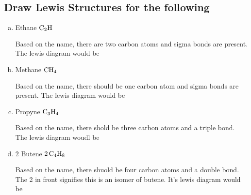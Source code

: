 \documentclass{scrartcl}
\begin{document}
\subsection{Draw Lewis Structures for the following}
\label{sec:org9180697}
\begin{enumerate}[a.]
\item Ethane \(\ce{C2H}\)

Based on the name, there are two carbon atoms and sigma bonds are present.
The lewis diagram would be

\item Methane \(\ce{CH4}\)

Based on the name, there should be one carbon atom and sigma bonds are
present. The lewis diagram would be

\item Propyne \(\ce{C3H4}\)

Based on the name, there shold be three carbon atoms and a triple bond. The
lewis diagram woudl be

\item 2 Butene \(\ce{2C4H8}\)

Based on the name, there shuold be four carbon atoms and a double bond. The 2
in front signifies this is an isomer of butene. It's lewis diagram would be
\end{enumerate}
\end{document}
